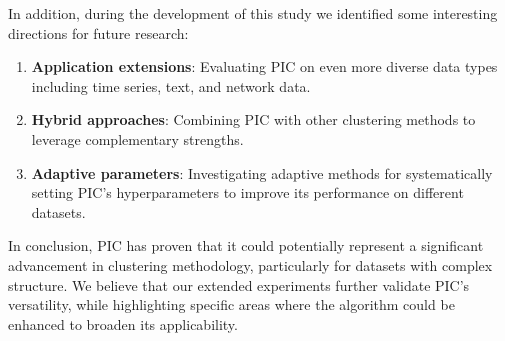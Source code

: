In addition, during the development of this study we identified some interesting directions for future research:

\begin{enumerate}
    \item \textbf{Application extensions}: Evaluating PIC on even more diverse data types including time series, text, and network data.

    \item \textbf{Hybrid approaches}: Combining PIC with other clustering methods to leverage complementary strengths.

    \item \textbf{Adaptive parameters}: Investigating adaptive methods for systematically setting PIC's hyperparameters to improve its performance on different datasets.
\end{enumerate}

In conclusion, PIC has proven that it could potentially represent a significant advancement in clustering methodology, particularly for datasets with complex structure. We believe that our extended experiments further validate PIC's versatility, while highlighting specific areas where the algorithm could be enhanced to broaden its applicability.